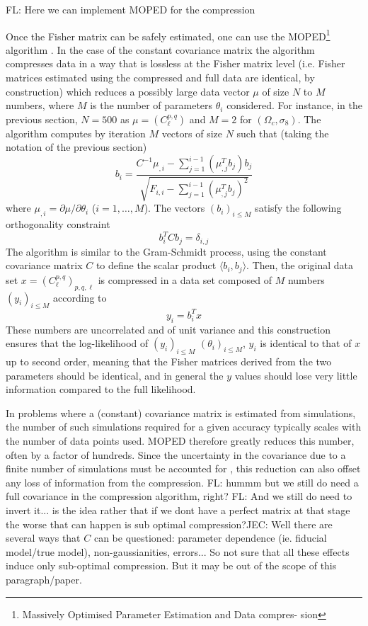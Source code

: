 \documentclass[twocolumn,twocolappendix,nofootinbib,iop]{openjournal}
\newcommand{\FrL}[1]{{\color{cyan}FL: #1}}
\newcommand{\JEC}[1]{{\color{magenta}JEC: #1}}
\begin{document}
\FrL{Here we can implement MOPED for the compression}

Once the Fisher matrix can be safely estimated, one can use the MOPED\footnote{Massively Optimised Parameter Estimation and Data compres-
sion} algorithm \citep{2000MNRAS.317..965H,2016PhRvD..93h3525Z, 2017MNRAS.472.4244H}. In the case of the constant covariance matrix the algorithm compresses data in a way that is lossless at the Fisher matrix level (i.e. Fisher matrices estimated using the compressed and full data are identical, by construction)  which reduces a possibly large data vector $\mu$ of size $N$ to $M$ numbers, where $M$ is the number of parameters $\theta_i$ considered. For instance, in the previous section, $N=500$ as $\mu=(C_\ell^{p,q})$ and $M=2$ for $(\Omega_c,\sigma_8)$. The algorithm computes by iteration $M$ vectors of size $N$ such that (taking the notation of the previous section)
\begin{equation}
    b_i = \frac{C^{-1}\mu_{,i}-\sum_{j=1}^{i-1}(\mu_{,j}^T b_j)b_j}{\sqrt{F_{i,i}-\sum_{j=1}^{i-1}(\mu_{,j}^T b_j)^2}}
\end{equation}
where $\mu_{,i}=\partial \mu/\partial \theta_i$ ($i=1,\dots,M$). The vectors $(b_i)_{i\leq M}$ satisfy the following orthogonality constraint
\begin{equation}
    b_i^T C b_j = \delta_{i,j}
\end{equation}
The algorithm is similar to the Gram-Schmidt process, using the constant covariance matrix $C$ to define the scalar product $\langle b_i, b_j\rangle$. Then, the original data set $x=(C_\ell^{p,q})_{p,q,\ell}$ is compressed in a data set composed of $M$ numbers $(y_i)_{i\leq M}$ according to
\begin{equation}
    y_i = b_i^T x
\end{equation}
These numbers are uncorrelated and of unit variance and this construction ensures that the log-likelihood of $(y_i)_{i\leq M}$  $(\theta_i)_{i\leq M}$, $y_i$ is identical to that of $x$ up to second order, meaning that the Fisher matrices derived from the two parameters should be identical, and in general the $y$ values should lose very little information compared to the full likelihood.

In problems where a (constant) covariance matrix is estimated from simulations, the number of such simulations required for a given accuracy typically scales with the number of data points used. 
MOPED therefore greatly reduces this number, often by a factor of hundreds. Since the uncertainty in the covariance due to a finite number of simulations must be accounted for \citep{2018MNRAS.473.2355S,2007A&A...464..399H}, this reduction can also offset any loss of information from the compression. \FrL{hummm but we still do need a full covariance in the compression algorithm, right?} \FrL{And we still do need to invert it... is the idea rather that if we dont have a perfect matrix at that stage the worse that can happen is sub optimal compression?}\JEC{Well there are several ways that $C$ can be questioned: parameter dependence (ie. fiducial model/true model), non-gaussianities, errors... So not sure that all these effects induce only sub-optimal compression. But it may be out of the scope of this paragraph/paper.}
\end{document}
